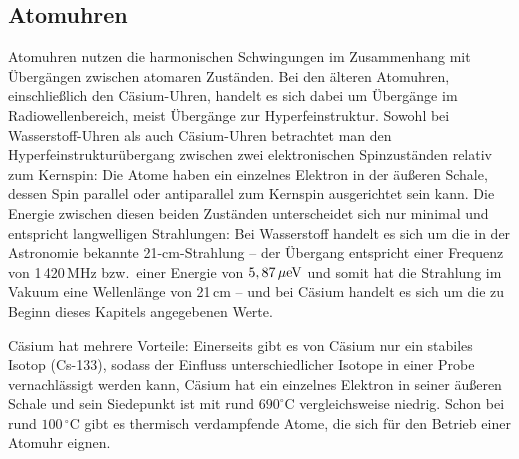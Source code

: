 \subsection{Atomuhren}

Atomuhren 
nutzen die harmonischen Schwingungen im Zusammenhang mit \"Uberg\"angen zwischen
atomaren Zust\"anden. Bei den \"alteren Atomuhren, einschlie\ss lich den C\"asium-Uhren, handelt es sich dabei
um \"Uberg\"ange im Radiowellenbereich, meist \"Uberg\"ange zur Hyperfeinstruktur. Sowohl bei
Wasserstoff-Uhren als auch C\"asium-Uhren betrachtet man den 
Hyperfeinstruktur\"ubergang 
zwischen zwei elektronischen Spinzust\"anden relativ zum Kernspin: Die Atome haben ein einzelnes
Elektron in der \"au\ss eren Schale, dessen Spin parallel oder antiparallel zum Kernspin ausgerichtet sein kann. 
Die Energie zwischen diesen beiden Zust\"anden unterscheidet sich nur minimal und entspricht
langwelligen Strahlungen: Bei Wasserstoff handelt es sich um die in der Astronomie bekannte
21-cm-Strahlung -- der \"Ubergang entspricht einer Frequenz von 1\,420\,MHz bzw.\ einer Energie
von $5,87\,\mu{\rm eV}$ und somit hat
die Strahlung im Vakuum eine Wellenl\"ange von 21\,cm -- und bei C\"asium handelt es sich um die
zu Beginn dieses Kapitels angegebenen Werte. 

C\"asium hat mehrere Vorteile: 
Einerseits gibt es von C\"asium nur ein stabiles Isotop (Cs-133), sodass
der Einfluss unterschiedlicher Isotope in einer Probe vernachl\"assigt werden kann, C\"asium hat ein einzelnes Elektron
in seiner \"au\ss eren Schale und sein Siedepunkt ist mit rund $690^\circ$C vergleichsweise niedrig. Schon bei
rund $100{\,}^\circ$C gibt es thermisch verdampfende Atome, die sich f\"ur den Betrieb einer Atomuhr eignen.

